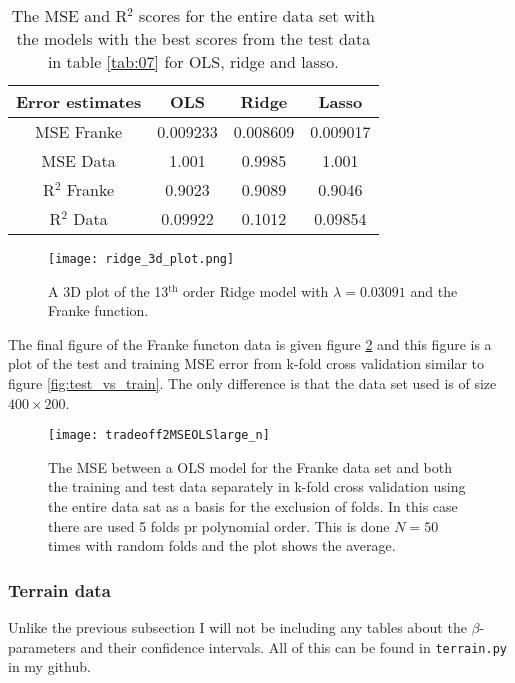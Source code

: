 \documentclass[uio,jmp,amsmath,amssymb,reprint,nofootinbib]{revtex4-1}
\numberwithin{equation}{section}
\begin{document}
\begin{table}
\begin{tabular}{|c|c|c|c|}\hline
Error estimates & OLS & Ridge & Lasso \\ \hline
MSE Franke & 0.009233 & 0.008609 & 0.009017 \\ \hline
MSE Data & 1.001 & 0.9985 & 1.001 \\ \hline
R\(^2\) Franke & 0.9023 & 0.9089 & 0.9046 \\ \hline
R\(^2\) Data & 0.09922 & 0.1012 & 0.09854 \\ \hline
\end{tabular}
\caption{The MSE and R\(^2\) scores for the entire data set with the models with the best scores from the test data in table \ref{tab:07} for OLS, ridge and lasso.}
\label{tab:08}
\end{table}

\begin{figure}[H]
    \centering
    \texttt{[image: ridge\_3d\_plot.png]}
    \caption{A 3D plot of the 13\(^\text{th}\) order Ridge model with \(\lambda = 0.03091\) and the Franke function.}
    \label{fig:ridge_3d}
\end{figure}

The final figure of the Franke functon data is given figure \ref{fig:test_vs_trainlarge_n} and this figure is a plot of the test and training MSE error from k-fold cross validation similar to figure \ref{fig:test_vs_train}. The only difference is that the data set used is of size \(400\times 200\).

\begin{figure}[H]
    \centering
    \texttt{[image: tradeoff2MSEOLSlarge\_n]}
    \caption{The MSE between a OLS model for the Franke data set and both the training and test data separately in k-fold cross validation using the entire data sat as a basis for the exclusion of folds. In this case there are used 5 folds pr polynomial order. This is done \(N=50\) times with random folds and the plot shows the average.}
    \label{fig:test_vs_trainlarge_n}
\end{figure}

\subsubsection{Terrain data}

Unlike the previous subsection I will not be including any tables about the \(\beta\)-parameters and their confidence intervals. All of this can be found in \texttt{terrain.py} in my github. 
\end{document}
